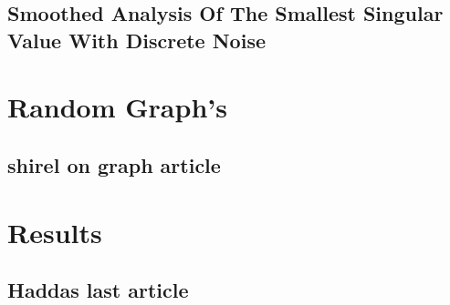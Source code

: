 \documentclass[12pt]{article}
\begin{document}


\subsection{Smoothed Analysis Of The Smallest Singular Value With Discrete Noise}



\section{Random Graph's}



\subsection{shirel on graph article}



\section{Results}

\subsection{Haddas last article}



\newpage
\printbibliography
\end{document}
